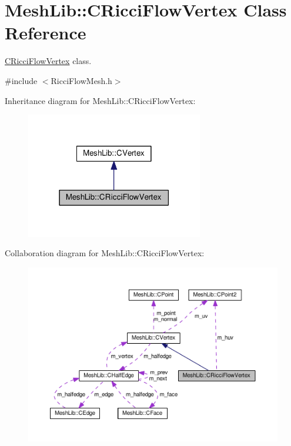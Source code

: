 \hypertarget{class_mesh_lib_1_1_c_ricci_flow_vertex}{}\section{Mesh\+Lib\+:\+:C\+Ricci\+Flow\+Vertex Class Reference}
\label{class_mesh_lib_1_1_c_ricci_flow_vertex}


\hyperlink{class_mesh_lib_1_1_c_ricci_flow_vertex}{C\+Ricci\+Flow\+Vertex} class.  




{\ttfamily \#include $<$Ricci\+Flow\+Mesh.\+h$>$}



Inheritance diagram for Mesh\+Lib\+:\+:C\+Ricci\+Flow\+Vertex\+:
\nopagebreak
\begin{figure}[H]
\begin{center}
\leavevmode
\includegraphics[width=219pt]{class_mesh_lib_1_1_c_ricci_flow_vertex__inherit__graph}
\end{center}
\end{figure}


Collaboration diagram for Mesh\+Lib\+:\+:C\+Ricci\+Flow\+Vertex\+:
\nopagebreak
\begin{figure}[H]
\begin{center}
\leavevmode
\includegraphics[width=350pt]{class_mesh_lib_1_1_c_ricci_flow_vertex__coll__graph}
\end{center}
\end{figure}
